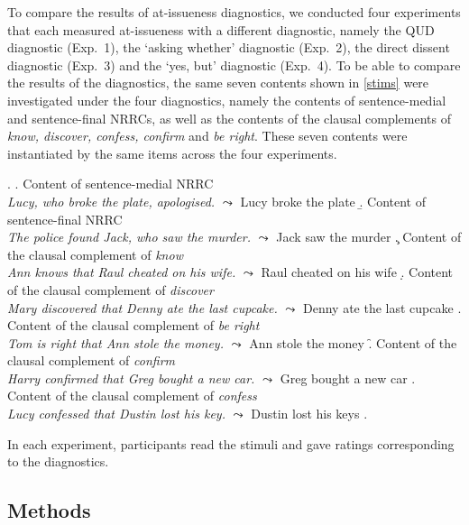 \documentclass[12pt]{article}
\begin{document}
To compare the results of at-issueness diagnostics, we conducted four experiments that each measured at-issueness with a different diagnostic, namely the QUD diagnostic (Exp.~1), the `asking whether' diagnostic (Exp.~2), the direct dissent diagnostic (Exp.~3) and the `yes, but' diagnostic (Exp.~4). To be able to compare the results of the diagnostics, the same seven contents shown in \ref{stims} were investigated under the four diagnostics, namely the contents of sentence-medial and sentence-final NRRCs, as well as the contents of the clausal complements of \emph{know, discover, confess, confirm} and \emph{be right}. These seven contents were instantiated by the same items across the four experiments.
  
    \ex.\label{stims}
      \a.\label{stims.a} Content of sentence-medial NRRC \\
        \emph{Lucy, who broke the plate, apologised.} $\leadsto$ Lucy broke the plate
      \b.\label{stims.b} Content of sentence-final NRRC \\
      \emph{The police found Jack, who saw the murder.} $\leadsto$ Jack saw the murder
      \c.\label{stims.c} Content of the clausal complement of \emph{know} \\
      \emph{Ann knows that Raul cheated on his wife.} $\leadsto$ Raul cheated on his wife
       \d.\label{stims.d} Content of the clausal complement of \emph{discover} \\
      \emph{Mary discovered that Denny ate the last cupcake.} $\leadsto$ Denny ate the last cupcake
       \e.\label{stims.e} Content of the clausal complement of \emph{be right} \\
      \emph{Tom is right that Ann stole the money.} $\leadsto$ Ann stole the money
       \f.\label{stims.f} Content of the clausal complement of \emph{confirm} \\
      \emph{Harry confirmed that Greg bought a new car.} $\leadsto$ Greg bought a new car
       \z.\label{stims.g} Content of the clausal complement of \emph{confess}  \\
      \emph{Lucy confessed that Dustin lost his key.} $\leadsto$ Dustin lost his keys
    \z.
    
In each experiment, participants read the stimuli and gave ratings corresponding to the diagnostics.  


  \subsection{Methods}
  
\end{document}

